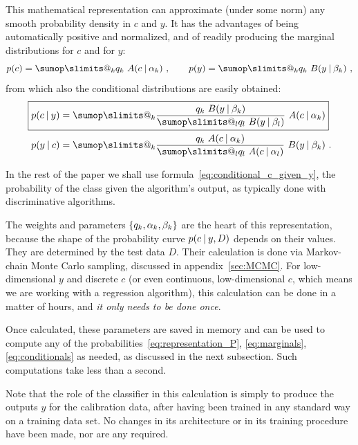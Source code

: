 \documentclass[\ifafour a4paper,12pt,\else a5paper,10pt,\fi%
onecolumn,oneside,article,%
british%
]{memoir}
\makeatletter
\theoremstyle{remark}
\theoremstyle{innote}
\def\sum{\DOTSI\sumop\slimits@}
\DeclarePairedDelimiter\set{\{}{\}} %
\renewcommand*{\|}[1][]{\nonscript\:#1\vert\nonscript\:\mathopen{}}
\makeatother
\begin{document}
This mathematical representation can approximate (under some norm) any smooth probability density in $c$ and $y$. It has the advantages of being automatically positive and normalized, and of readily producing the marginal distributions for $c$ and for $y$:
\begin{equation}
  \label{eq:marginals}
  p(c) = \sum_{k} q_{k}\ A(c \| \alpha_{k})\ ,
  \qquad
  p(y) = \sum_{k} q_{k}\ B(y \| \beta_{k}) \ ,
\end{equation}
from which also the conditional distributions are easily obtained:
\begin{subequations} \label{eq:conditionals}
  \begin{align}
    \label{eq:conditional_c_given_y}
  \Aboxed{  p(c \| y) &= \sum_{k} \frac{q_{k}\ B(y \| \beta_{k})
                }{\sum_{l} q_{l}\ B(y \| \beta_{l})}\
                A(c \| \alpha_{k})}
    \\
    \label{eq:conditional_y_given_c}
    p(y \| c) &= \sum_{k} \frac{q_{k}\ A(c \| \alpha_{k})
                }{\sum_{l} q_{l}\ A(c \| \alpha_{l})}\
                B(y \| \beta_{k}) \ .
  \end{align}
\end{subequations}

In the rest of the paper we shall use formula~\eqref{eq:conditional_c_given_y}, the probability of the class given the algorithm's output, as typically done with discriminative algorithms. 

\medskip

The weights and parameters $\set{q_{k}, \alpha_{k}, \beta_{k}}$ are the heart of this representation, because the shape of the probability curve $p(c \| y, D)$ depends on their values. They are determined by the test data $D$. Their calculation is done via Markov-chain Monte Carlo sampling, discussed in appendix~\ref{sec:MCMC}. For low-dimensional $y$ and discrete $c$ (or even continuous, low-dimensional $c$, which means we are working with a regression algorithm), this calculation can be done in a matter of hours, and \emph{it only needs to be done once}.

Once calculated, these parameters are saved in memory and can be used to compute any of the probabilities~\eqref{eq:representation_P}, \eqref{eq:marginals}, \eqref{eq:conditionals} as needed, as discussed in the next subsection. Such computations take less than a second.

Note that the role of the classifier in this calculation is simply to produce the outputs $y$ for the calibration data, after having been trained in any standard way on a training data set. No changes in its architecture or in its training procedure have been made, nor are any required.
\end{document}
